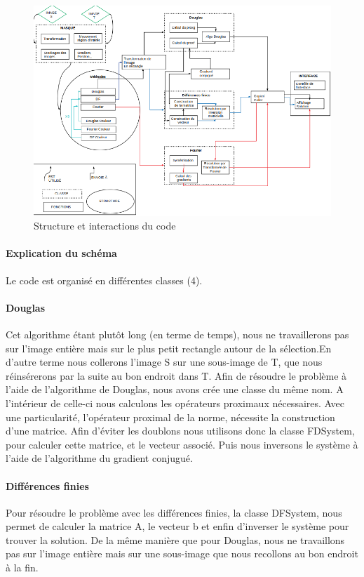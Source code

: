 
\begin{figure}
\includegraphics[scale=0.65]{Images/code/schema.png}
\caption{Structure et interactions du code}
\end{figure}
\newpage

\paragraph{Explication du schéma}
Le code est organisé en différentes classes (4).
\paragraph{Douglas}
Cet algorithme étant plutôt long (en terme de temps), nous ne travaillerons pas sur l'image entière mais sur le plus petit rectangle autour de la sélection.En d'autre terme nous collerons l'image S sur une sous-image de T, que nous réinsérerons par la suite au bon endroit dans T. Afin de résoudre le problème à l'aide de l'algorithme de Douglas, nous avons crée une classe du même nom.  A l'intérieur de celle-ci nous calculons les opérateurs proximaux nécessaires. Avec une particularité, l'opérateur proximal de la norme, nécessite la construction d'une matrice. Afin d'éviter les doublons nous utilisons donc la classe FDSystem, pour calculer cette matrice, et le vecteur associé. Puis nous inversons le système à l'aide de l'algorithme du gradient conjugué. 
\paragraph{Différences finies}
Pour résoudre le problème avec les différences finies, la classe DFSystem, nous permet de calculer la matrice A, le vecteur b et enfin d'inverser le système pour trouver la solution. De la même manière que pour Douglas, nous ne travaillons pas sur l'image entière mais sur une sous-image que nous recollons au bon endroit à la fin.
